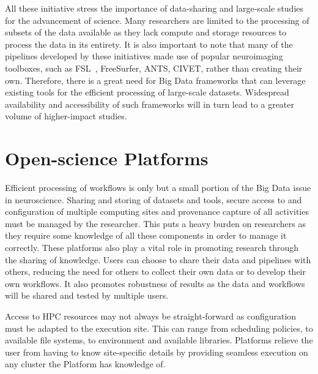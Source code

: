 \documentclass{report}
\begin{document}
            All these initiative stress the importance of data-sharing and
            large-scale studies for the advancement of science. Many researchers
            are limited to the processing of subsets of the data available as 
            they lack compute and storage resources to process the data in its
            entirety. It is also important to note that many of the pipelines 
            developed by these initiatives made use of popular neuroimaging 
            toolboxes, such as FSL~\cite{SMITH2004S208}, FreeSurfer, ANTS, 
            CIVET, rather than
            creating their own. Therefore, there is a great need for Big Data
            frameworks that can leverage existing tools for the efficient 
            processing of large-scale datasets. Widespread availability and 
            accessibility of such frameworks will in turn lead to a greater
            volume of higher-impact studies.


        \section{Open-science Platforms}\label{platforms}
            Efficient processing of workflows is only but a small portion of 
            the Big Data issue in neuroscience. %
            Sharing and storing of datasets
            and tools, secure access to and configuration of multiple computing 
            sites and provenance capture of all activities must be managed by 
            the researcher. This puts a heavy burden on researchers as they 
            require some knowledge of all these components in order to manage it
            correctly. These platforms also play a vital role in promoting 
            research through the sharing of knowledge. Users can choose to share
            their data and pipelines with others, reducing the need for others 
            to collect their own data or to develop their own workflows. It 
            also promotes robustness of results as the data and workflows will 
            be shared and tested by multiple users.

            Access to HPC resources may not always be straight-forward as 
            configuration must be adapted to the execution site. This can 
            range from scheduling policies, to available file systems, to 
            environment and available libraries. Platforms relieve the user
            from having to know site-specific details by providing seamless
            execution on any cluster the Platform has knowledge of.
\end{document}
